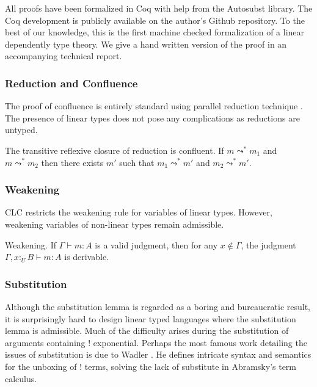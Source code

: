 \documentclass[sigplan,screen,review,anonymous]{acmart}
\newcommand{\utype}{:_{\scriptscriptstyle U}}
\newcommand{\step}{\leadsto}
\begin{document}
All proofs have been formalized in Coq with help from the Autosubst \cite{autosubst} library. The Coq development is publicly available on the author's Github repository. To the best of our knowledge, this is the first machine checked formalization of a linear dependently type theory. We give a hand written version of the proof in an accompanying technical report.

\subsubsection{Reduction and Confluence}

The proof of confluence is entirely standard using parallel reduction technique \cite{takahashi}. The presence of linear types does not pose any complications as reductions are untyped.

\begin{theorem}
  The transitive reflexive closure of reduction is confluent. If $m \step^* m_1$ and $m \step^* m_2$ then there exists $m'$ such that $m_1 \step^* m'$ and $m_2 \step^* m'$.
\end{theorem}

\subsubsection{Weakening} \label{weakening}
CLC restricts the weakening rule for variables of linear types. However, weakening variables of non-linear types remain admissible.

\begin{theorem}
  Weakening. If $\Gamma \vdash m : A$ is a valid judgment, then for any $x \notin \Gamma$, the judgment $\Gamma, x \utype B \vdash m : A$ is derivable.
\end{theorem}

\subsubsection{Substitution} \label{subst}
Although the substitution lemma is regarded as a boring and bureaucratic result, it is surprisingly hard to design linear typed languages where the substitution lemma is admissible. Much of the difficulty arises during the substitution of arguments containing ! exponential. Perhaps the most famous work detailing the issues of substitution is due to Wadler \cite{substitute}. He defines intricate syntax and semantics for the unboxing of ! terms, solving the lack of substitute in Abramsky's term calculus.
\end{document}
